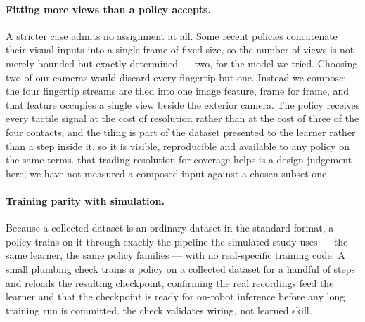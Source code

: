 \paragraph{Fitting more views than a policy accepts.} A stricter case admits
no assignment at all. Some recent policies concatenate their visual inputs
into a single frame of fixed size, so the number of views is not merely
bounded but exactly determined --- two, for the model we tried. Choosing two
of our cameras would discard every fingertip but one. Instead we compose: the
four fingertip streams are tiled into one image feature, frame for frame, and
that feature occupies a single view beside the exterior camera. The policy
receives every tactile signal at the cost of resolution rather than at the
cost of three of the four contacts, and the tiling is part of the dataset
presented to the learner rather than a step inside it, so it is visible,
reproducible and available to any policy on the same terms. \unjustified{}
that trading resolution for coverage helps is a design judgement here; we have
not measured a composed input against a chosen-subset one.

\paragraph{Training parity with simulation.} Because a collected dataset is
an ordinary dataset in the standard format, a policy trains on it through
exactly the pipeline the simulated study uses --- the same learner, the same
policy families --- with no real-specific training code. A small
plumbing check trains a policy on a collected dataset for a handful of steps
and reloads the resulting checkpoint, confirming the real recordings feed the
learner and that the checkpoint is ready for on-robot inference before any
long training run is committed. \unjustified{} the check validates wiring, not
learned skill.

